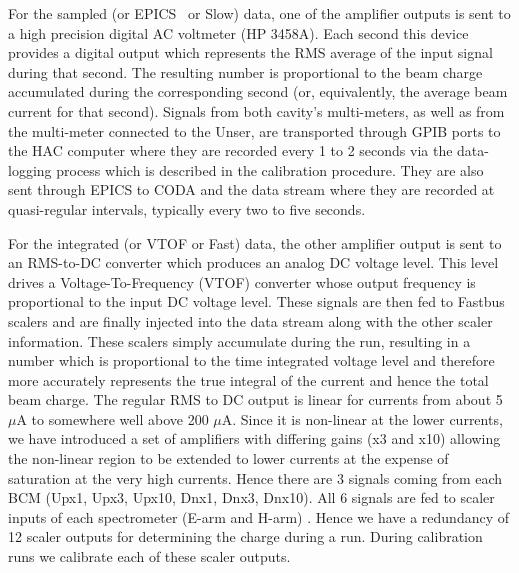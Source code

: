 {For the sampled (or EPICS~\cite{EPICSwww} or Slow) data, one of the
amplifier outputs is sent to a high precision digital AC voltmeter (HP
3458A). Each second this device provides a digital output which
represents the RMS average of the input signal during that second.
The resulting number is proportional to the beam charge accumulated
during the corresponding second (or, equivalently, the average beam
current for that second). Signals from both cavity's multi-meters, as
well as from the multi-meter connected to the Unser, are transported
through GPIB ports to the HAC computer where they are recorded every 1
to 2 seconds via the data-logging process which is described in the
calibration procedure. They are also sent through EPICS to CODA and
the data stream where they are recorded at quasi-regular intervals,
typically every two to five seconds.

For the integrated (or VTOF or Fast) data, the other amplifier output
is sent to an RMS-to-DC converter which produces an analog DC voltage
level. This level drives a Voltage-To-Frequency (VTOF) converter whose
output frequency is proportional to the input DC voltage level. These
signals are then fed to Fastbus scalers and are finally injected into
the data stream along with the other scaler information.  These
scalers simply accumulate during the run, resulting in a number which
is proportional to the time integrated voltage level and therefore
more accurately represents the true integral of the current and hence
the total beam charge. The regular RMS to DC output is linear for
currents from about 5 $\mu$A to somewhere well above 200 $\mu$A.
Since it is non-linear at the lower currents, we have introduced a set
of amplifiers with differing gains (x3 and x10) allowing the
non-linear region to be extended to lower currents at the expense of
saturation at the very high currents. Hence there are 3 signals coming
from each BCM (Upx1, Upx3, Upx10, Dnx1, Dnx3, Dnx10). All 6 signals
are fed to scaler inputs of each spectrometer (E-arm and H-arm)
. Hence we have a redundancy of 12 scaler outputs for determining the
charge during a run. During calibration runs we calibrate each of
these scaler outputs.
}%

